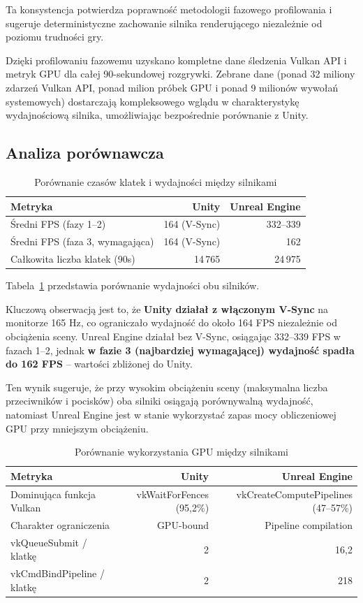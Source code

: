Ta konsystencja potwierdza poprawność metodologii fazowego profilowania i sugeruje deterministyczne zachowanie silnika renderującego niezależnie od 
poziomu trudności gry.


Dzięki profilowaniu fazowemu uzyskano kompletne dane śledzenia Vulkan API i metryk GPU dla całej 90-sekundowej rozgrywki.
Zebrane dane (ponad 32 miliony zdarzeń Vulkan API, ponad milion próbek GPU i ponad 9 milionów wywołań systemowych) dostarczają
kompleksowego wglądu w charakterystykę wydajnościową silnika, umożliwiając bezpośrednie porównanie z Unity.

\subsection{Analiza porównawcza}
\label{subsec:analiza-porownawcza}


\begin{table}[H]
\centering
\caption{Porównanie czasów klatek i wydajności między silnikami}
\label{tab:frame-time-comparison}
\begin{tabular}{|l|r|r|}
\hline
\textbf{Metryka} & \textbf{Unity} & \textbf{Unreal Engine} \\
\hline
Średni FPS (fazy 1--2) & 164 (V-Sync) & 332--339 \\
Średni FPS (faza 3, wymagająca) & 164 (V-Sync) & 162 \\
Całkowita liczba klatek (90s) & 14\,765 & 24\,975 \\
\hline
\end{tabular}
\end{table}

Tabela~\ref{tab:frame-time-comparison} przedstawia porównanie wydajności obu silników.

Kluczową obserwacją jest to, że \textbf{Unity działał z włączonym V-Sync} na monitorze 165 Hz,
co ograniczało wydajność do około 164 FPS niezależnie od obciążenia sceny. Unreal Engine działał
bez V-Sync, osiągając 332--339 FPS w fazach 1--2, jednak \textbf{w fazie 3 (najbardziej wymagającej)
wydajność spadła do 162 FPS} -- wartości zbliżonej do Unity.

Ten wynik sugeruje, że przy wysokim obciążeniu sceny (maksymalna liczba przeciwników i pocisków)
oba silniki osiągają porównywalną wydajność, natomiast Unreal Engine jest w stanie wykorzystać
zapas mocy obliczeniowej GPU przy mniejszym obciążeniu.


\begin{table}[H]
\centering
\caption{Porównanie wykorzystania GPU między silnikami}
\label{tab:gpu-comparison}
\footnotesize
\begin{tabular}{|l|r|r|}
\hline
\textbf{Metryka} & \textbf{Unity} & \textbf{Unreal Engine} \\
\hline
Dominująca funkcja Vulkan & vkWaitForFences (95,2\%) & vkCreateComputePipelines (47--57\%) \\
Charakter ograniczenia & GPU-bound & Pipeline compilation \\
vkQueueSubmit / klatkę & 2 & 16,2 \\
vkCmdBindPipeline / klatkę & 2 & 218 \\
\hline
\end{tabular}
\end{table}


